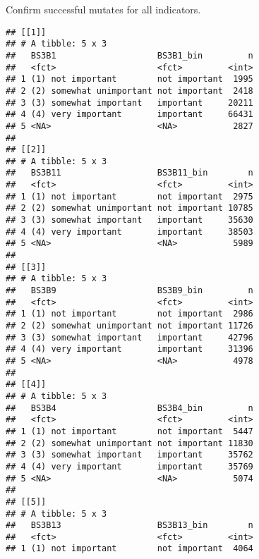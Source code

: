 \documentclass[]{article}
\newenvironment{Shaded}{\begin{snugshade}}{\end{snugshade}}
\newcommand{\KeywordTok}[1]{\textcolor[rgb]{0.13,0.29,0.53}{\textbf{#1}}}
\newcommand{\NormalTok}[1]{#1}
\newcommand{\OperatorTok}[1]{\textcolor[rgb]{0.81,0.36,0.00}{\textbf{#1}}}
\newcommand{\StringTok}[1]{\textcolor[rgb]{0.31,0.60,0.02}{#1}}
\begin{document}
Confirm successful mutates for all indicators.

\begin{Shaded}
\end{Shaded}

\begin{verbatim}
## [[1]]
## # A tibble: 5 x 3
##   BS3B1                    BS3B1_bin         n
##   <fct>                    <fct>         <int>
## 1 (1) not important        not important  1995
## 2 (2) somewhat unimportant not important  2418
## 3 (3) somewhat important   important     20211
## 4 (4) very important       important     66431
## 5 <NA>                     <NA>           2827
## 
## [[2]]
## # A tibble: 5 x 3
##   BS3B11                   BS3B11_bin        n
##   <fct>                    <fct>         <int>
## 1 (1) not important        not important  2975
## 2 (2) somewhat unimportant not important 10785
## 3 (3) somewhat important   important     35630
## 4 (4) very important       important     38503
## 5 <NA>                     <NA>           5989
## 
## [[3]]
## # A tibble: 5 x 3
##   BS3B9                    BS3B9_bin         n
##   <fct>                    <fct>         <int>
## 1 (1) not important        not important  2986
## 2 (2) somewhat unimportant not important 11726
## 3 (3) somewhat important   important     42796
## 4 (4) very important       important     31396
## 5 <NA>                     <NA>           4978
## 
## [[4]]
## # A tibble: 5 x 3
##   BS3B4                    BS3B4_bin         n
##   <fct>                    <fct>         <int>
## 1 (1) not important        not important  5447
## 2 (2) somewhat unimportant not important 11830
## 3 (3) somewhat important   important     35762
## 4 (4) very important       important     35769
## 5 <NA>                     <NA>           5074
## 
## [[5]]
## # A tibble: 5 x 3
##   BS3B13                   BS3B13_bin        n
##   <fct>                    <fct>         <int>
## 1 (1) not important        not important  4064

\end{verbatim}
\end{document}
